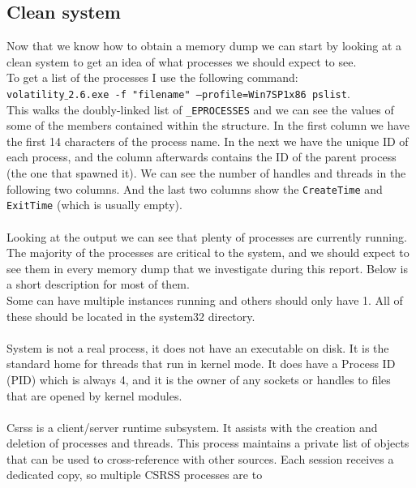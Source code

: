 \documentclass[a4paper]{article}
\begin{document}
\subsection{Clean system}

Now that we know how to obtain a memory dump we can start by looking at a clean system to
get an idea of what processes we should expect to see. \\
To get a list of the processes I use the following command: \\
\texttt{volatility$\_$2.6.exe -f "filename" --profile=Win7SP1x86 pslist}. \\
This walks the doubly-linked list of \texttt{\_EPROCESSES} and we can see the values of some of the
members contained within the structure. In the first column we have the first 14 characters of
the process name. In the next we have the unique ID of each process, and the column afterwards
contains the ID of the parent process (the one that spawned it). We can see the number of handles
and threads in the following two columns. And the last two columns show the \texttt{CreateTime} and
\texttt{ExitTime} (which is usually empty). \\\\
%
%
Looking at the output we can see that plenty of processes are currently running. The majority
of the processes are critical to the system, and we should expect to see them in every memory
dump that we investigate during this report. Below is a short description for most of them. \\
Some can have multiple instances running and others should only have 1. All of these should be
located in the system32 directory. \\\\
%
%
System is not a real process, it does not have an executable on disk. It is the standard home
for threads that run in kernel mode. It does have a Process ID (PID) which is always 4, and it is
the owner of any sockets or handles to files that are opened by kernel modules. \\\\
%
Csrss is a client/server runtime subsystem. It assists with the creation and deletion of processes
and threads. This process maintains a private list of objects that can be used to cross-reference
with other sources. Each session receives a dedicated copy, so multiple CSRSS processes are to
\end{document}
